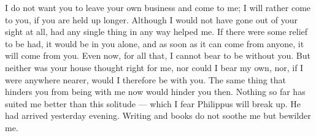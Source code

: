 

 I do not want you to leave your own business and come to me; I will rather come to you, if you are held up longer. Although I would not have gone out of your sight at all, had any single thing in any way helped me. If there were some relief to be had, it would be in you alone, and as soon as it can come from anyone, it will come from you. Even now, for all that, I cannot bear to be without you. But neither was your house thought right for me, nor could I bear my own, nor, if I were anywhere nearer, would I therefore be with you. The same thing that hinders you from being with me now would hinder you then. Nothing so far has suited me better than this solitude --- which I fear Philippus will break up. He had arrived yesterday evening. Writing and books do not soothe me but bewilder me.
